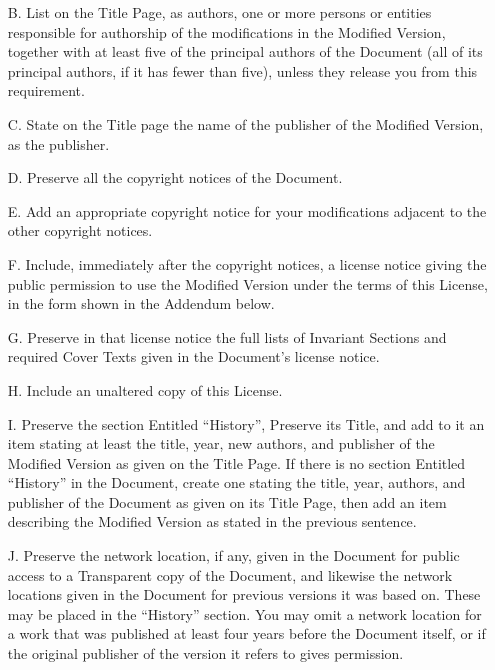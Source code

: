\documentclass[10pt,a4paper,ngerman,titlepage,tocindentauto]{article}
\begin{document}
\begin{multicols}{3}
{\begin{itemize}
					\item[B.]
						List on the Title Page, as authors, one or more persons or entities
						responsible for authorship of the modifications in the Modified
						Version, together with at least five of the principal authors of the
						Document (all of its principal authors, if it has fewer than five),
						unless they release you from this requirement.
						
					\item[C.]
						State on the Title page the name of the publisher of the
						Modified Version, as the publisher.
						
					\item[D.]
						Preserve all the copyright notices of the Document.
						
					\item[E.]
						Add an appropriate copyright notice for your modifications
						adjacent to the other copyright notices.
						
					\item[F.]
						Include, immediately after the copyright notices, a license notice
						giving the public permission to use the Modified Version under the
						terms of this License, in the form shown in the Addendum below.
						
					\item[G.]
						Preserve in that license notice the full lists of Invariant Sections
						and required Cover Texts given in the Document's license notice.
						
					\item[H.]
						Include an unaltered copy of this License.
						
					\item[I.]
						Preserve the section Entitled ``History'', Preserve its Title, and add
						to it an item stating at least the title, year, new authors, and
						publisher of the Modified Version as given on the Title Page.  If
						there is no section Entitled ``History'' in the Document, create one
						stating the title, year, authors, and publisher of the Document as
						given on its Title Page, then add an item describing the Modified
						Version as stated in the previous sentence.
						
					\item[J.]
						Preserve the network location, if any, given in the Document for
						public access to a Transparent copy of the Document, and likewise
						the network locations given in the Document for previous versions
						it was based on.  These may be placed in the ``History'' section.
						You may omit a network location for a work that was published at
						least four years before the Document itself, or if the original
						publisher of the version it refers to gives permission.
						

\end{itemize}}
\end{multicols}
\end{document}
